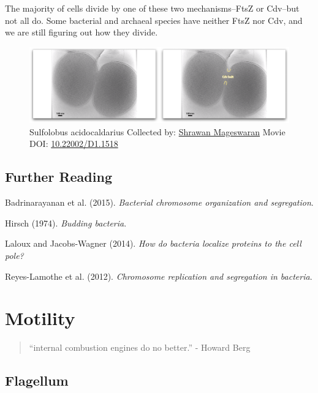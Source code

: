 \documentclass[]{tufte-book}
\begin{document}
The majority of cells divide by one of these two mechanisms--FtsZ or
Cdv--but not all do. Some bacterial and archaeal species have neither
FtsZ nor Cdv, and we are still figuring out how they divide.





\begin{figure}
\includegraphics{movie_stills/5_12} \caption[Sulfolobus acidocaldarius Collected by:
\protect\hyperlink{shrawan_mageswaran}{Shrawan Mageswaran} Movie DOI:
\href{https://doi.org/10.22002/D1.1518}{10.22002/D1.1518}]{Sulfolobus acidocaldarius Collected by:
\protect\hyperlink{shrawan_mageswaran}{Shrawan Mageswaran} Movie DOI:
\href{https://doi.org/10.22002/D1.1518}{10.22002/D1.1518}}\label{fig:5-12}
\end{figure}

\section{Further Reading}\label{further-reading}

Badrinarayanan et al. (2015). \emph{Bacterial chromosome organization
and segregation}.\citep{badrinarayanan2015}

Hirsch (1974). \emph{Budding bacteria}.\citep{hirsch1974}

Laloux and Jacobs-Wagner (2014). \emph{How do bacteria localize proteins
to the cell pole?}\citep{laloux2014}

Reyes-Lamothe et al. (2012). \emph{Chromosome replication and
segregation in bacteria}.\citep{reyes-lamothe2012}

\chapter{Motility}\label{motility}

\begin{quote}
``internal combustion engines do no better.'' - Howard Berg
\citep{berg1988}
\end{quote}

\section{Flagellum}\label{flagellum}
\end{document}
